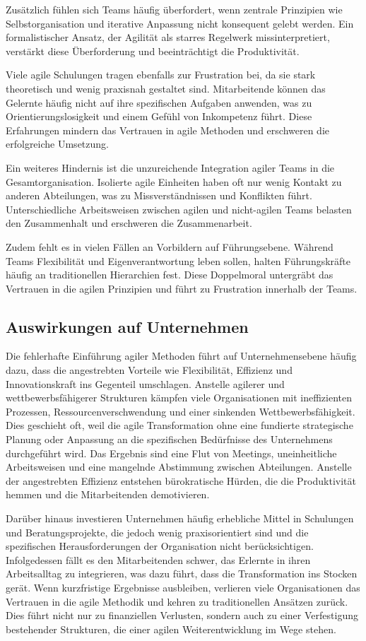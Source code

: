 \documentclass[ngerman]{seminarvorlage}
\begin{document}
Zusätzlich fühlen sich Teams häufig überfordert, wenn zentrale Prinzipien wie Selbstorganisation und iterative Anpassung nicht konsequent gelebt werden. Ein formalistischer Ansatz, der Agilität als starres Regelwerk missinterpretiert, verstärkt diese Überforderung und beeinträchtigt die Produktivität.

Viele agile Schulungen tragen ebenfalls zur Frustration bei, da sie stark theoretisch und wenig praxisnah gestaltet sind. Mitarbeitende können das Gelernte häufig nicht auf ihre spezifischen Aufgaben anwenden, was zu Orientierungslosigkeit und einem Gefühl von Inkompetenz führt. Diese Erfahrungen mindern das Vertrauen in agile Methoden und erschweren die erfolgreiche Umsetzung.

Ein weiteres Hindernis ist die unzureichende Integration agiler Teams in die Gesamtorganisation. Isolierte agile Einheiten haben oft nur wenig Kontakt zu anderen Abteilungen, was zu Missverständnissen und Konflikten führt. Unterschiedliche Arbeitsweisen zwischen agilen und nicht-agilen Teams belasten den Zusammenhalt und erschweren die Zusammenarbeit.

Zudem fehlt es in vielen Fällen an Vorbildern auf Führungsebene. Während Teams Flexibilität und Eigenverantwortung leben sollen, halten Führungskräfte häufig an traditionellen Hierarchien fest. Diese Doppelmoral untergräbt das Vertrauen in die agilen Prinzipien und führt zu Frustration innerhalb der Teams.
\cite{moutafis_warum_2019}

\subsection{Auswirkungen auf Unternehmen}
Die fehlerhafte Einführung agiler Methoden führt auf Unternehmensebene häufig dazu, dass die angestrebten Vorteile wie Flexibilität, Effizienz und Innovationskraft ins Gegenteil umschlagen. Anstelle agilerer und wettbewerbsfähigerer Strukturen kämpfen viele Organisationen mit ineffizienten Prozessen, Ressourcenverschwendung und einer sinkenden Wettbewerbsfähigkeit. Dies geschieht oft, weil die agile Transformation ohne eine fundierte strategische Planung oder Anpassung an die spezifischen Bedürfnisse des Unternehmens durchgeführt wird. Das Ergebnis sind eine Flut von Meetings, uneinheitliche Arbeitsweisen und eine mangelnde Abstimmung zwischen Abteilungen. Anstelle der angestrebten Effizienz entstehen bürokratische Hürden, die die Produktivität hemmen und die Mitarbeitenden demotivieren.

Darüber hinaus investieren Unternehmen häufig erhebliche Mittel in Schulungen und Beratungsprojekte, die jedoch wenig praxisorientiert sind und die spezifischen Herausforderungen der Organisation nicht berücksichtigen. Infolgedessen fällt es den Mitarbeitenden schwer, das Erlernte in ihren Arbeitsalltag zu integrieren, was dazu führt, dass die Transformation ins Stocken gerät. Wenn kurzfristige Ergebnisse ausbleiben, verlieren viele Organisationen das Vertrauen in die agile Methodik und kehren zu traditionellen Ansätzen zurück. Dies führt nicht nur zu finanziellen Verlusten, sondern auch zu einer Verfestigung bestehender Strukturen, die einer agilen Weiterentwicklung im Wege stehen.
\end{document}

